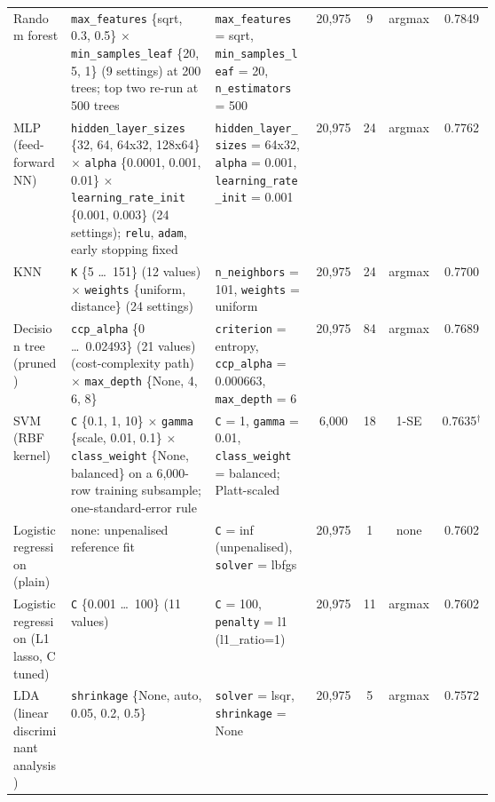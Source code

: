 \begin{table}[!htbp]
\begin{tabular}{@{}L{0.12\linewidth}L{0.30\linewidth}L{0.21\linewidth}cccc@{}}
    Random forest & \texttt{max\_\allowbreak{}features} \{sqrt, 0.3, 0.5\} $\times$ \texttt{min\_\allowbreak{}samples\_\allowbreak{}leaf} \{20, 5, 1\} (9 settings) at 200 trees; top two re-run at 500 trees & \texttt{max\_\allowbreak{}features} = sqrt, \texttt{min\_\allowbreak{}samples\_\allowbreak{}leaf} = 20, \texttt{n\_\allowbreak{}estimators} = 500 & 20,975 & 9 & argmax & 0.7849 \\
    MLP (feed-forward NN) & \texttt{hidden\_\allowbreak{}layer\_\allowbreak{}sizes} \{32, 64, 64x32, 128x64\} $\times$ \texttt{alpha} \{0.0001, 0.001, 0.01\} $\times$ \texttt{learning\_\allowbreak{}rate\_\allowbreak{}init} \{0.001, 0.003\} (24 settings); \texttt{relu}, \texttt{adam}, early stopping fixed & \texttt{hidden\_\allowbreak{}layer\_\allowbreak{}sizes} = 64x32, \texttt{alpha} = 0.001, \texttt{learning\_\allowbreak{}rate\_\allowbreak{}init} = 0.001 & 20,975 & 24 & argmax & 0.7762 \\
    KNN & \texttt{K} \{5 \dots\ 151\} (12 values) $\times$ \texttt{weights} \{uniform, distance\} (24 settings) & \texttt{n\_\allowbreak{}neighbors} = 101, \texttt{weights} = uniform & 20,975 & 24 & argmax & 0.7700 \\
    Decision tree (pruned) & \texttt{ccp\_\allowbreak{}alpha} \{0 \dots\ 0.02493\} (21 values) (cost-complexity path) $\times$ \texttt{max\_\allowbreak{}depth} \{None, 4, 6, 8\} & \texttt{criterion} = entropy, \texttt{ccp\_\allowbreak{}alpha} = 0.000663, \texttt{max\_\allowbreak{}depth} = 6 & 20,975 & 84 & argmax & 0.7689 \\
    SVM (RBF kernel) & \texttt{C} \{0.1, 1, 10\} $\times$ \texttt{gamma} \{scale, 0.01, 0.1\} $\times$ \texttt{class\_\allowbreak{}weight} \{None, balanced\} on a 6,000-row training subsample; one-standard-error rule & \texttt{C} = 1, \texttt{gamma} = 0.01, \texttt{class\_\allowbreak{}weight} = balanced; Platt-scaled & 6,000 & 18 & 1-SE & 0.7635$^{\dagger}$ \\
    Logistic regression (plain) & none: unpenalised reference fit & \texttt{C} = inf (unpenalised), \texttt{solver} = lbfgs & 20,975 & 1 & none & 0.7602 \\
    Logistic regression (L1 lasso, C tuned) & \texttt{C} \{0.001 \dots\ 100\} (11 values) & \texttt{C} = 100, \texttt{penalty} = l1 (l1\_ratio=1) & 20,975 & 11 & argmax & 0.7602 \\
    LDA (linear discriminant analysis) & \texttt{shrinkage} \{None, auto, 0.05, 0.2, 0.5\} & \texttt{solver} = lsqr, \texttt{shrinkage} = None & 20,975 & 5 & argmax & 0.7572 \\

\end{tabular}
\end{table}
